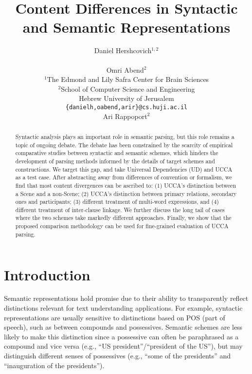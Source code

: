 \documentclass[11pt,a4paper]{article}
\title{Content Differences in Syntactic and Semantic Representations}
\author{Daniel Hershcovich$^{1,2}$ \\
  \\\And
  Omri Abend$^2$ \\
  $^1$The Edmond and Lily Safra Center for Brain Sciences \\
  $^2$School of Computer Science and Engineering \\
  Hebrew University of Jerusalem \\
  \texttt{\{danielh,oabend,arir\}@cs.huji.ac.il}
  \\\And
  Ari Rappoport$^2$
}
\date{}
\begin{document}
\maketitle

\begin{abstract}

  Syntactic analysis plays an important role in semantic parsing,
  but this role remains a topic of ongoing debate.
  The debate has been constrained by the scarcity of empirical comparative studies between syntactic and semantic schemes,
  which hinders the development of parsing methods informed by the details of target schemes and constructions.
  We target this gap, and take Universal Dependencies (UD) and UCCA as a test case.
  After abstracting away from differences of convention or formalism,
  we find that most content divergences can be ascribed to: 
  (1) UCCA's distinction between a Scene and a non-Scene; %
  (2) UCCA's distinction between primary relations, secondary ones and participants; %
  (3) different treatment of multi-word expressions, and
  (4) different treatment of inter-clause linkage.
  We further discuss the long tail of cases where the two schemes take markedly
  different approaches.
  Finally, we show that the proposed comparison methodology can be used
  for fine-grained evaluation of UCCA parsing.
\end{abstract}


\section{Introduction}\label{sec:introduction}
  
  Semantic representations hold promise due to
  their ability to transparently reflect distinctions relevant for text understanding
  applications. For example, syntactic representations
  are usually sensitive to distinctions based on POS (part of speech), such as between compounds
  and possessives. Semantic schemes are  less likely to make
  this distinction since a possessive can often be paraphrased as a compound
  and vice versa (e.g., ``US president''/``president of the US''),
  but may distinguish different senses of possessives (e.g., ``some of the presidents'' and ``inauguration of the presidents'').
\end{document}
